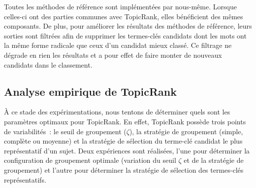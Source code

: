       Toutes les méthodes de référence sont implémentées par nous-même. Lorsque
      celles-ci ont des parties communes avec TopicRank, elles bénéficient des
      mêmes composants. De plus, pour améliorer les résultats des méthodes de
      référence, leurs sorties sont filtrées afin de supprimer les termes-clés
      candidats dont les mots ont la même forme radicale que ceux d'un candidat
      mieux classé. Ce filtrage ne dégrade en rien les résultats et a pour effet
      de faire monter de nouveaux candidats dans le classement.

  \subsection{Analyse empirique de TopicRank}
  \label{subsection:configuration_empirique_de_topicrank}
    À ce stade des expérimentations, nous tentons de déterminer quels sont les
    paramètres optimaux pour TopicRank. En effet, TopicRank possède trois points
    de variabilités~: le seuil de groupement ($\zeta$), la stratégie de
    groupement (simple, complète ou moyenne) et la stratégie de sélection du
    terme-clé candidat le plus représentatif d'un sujet. Deux expériences sont
    réalisées, l'une pour déterminer la configuration de groupement optimale
    (variation du seuil $\zeta$ et de la stratégie de groupement) et l'autre
    pour déterminer la stratégie de sélection des termes-clés représentatifs.

